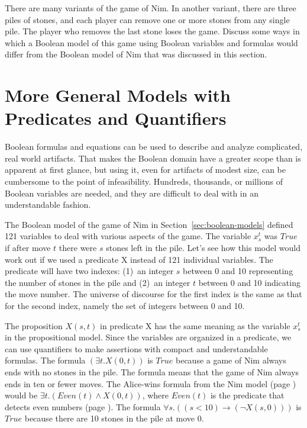 {{\begin{ExerciseList}
\Exercise
There are many variants of the game of Nim.
In another variant, there are three piles of stones, and each player can remove
one or more stones from any single pile.
The player who removes the last stone loses the game.
Discuss some ways in which a Boolean model of this game
using Boolean variables and formulas would
differ from the Boolean model of Nim that was discussed in this section.

\end{ExerciseList}

\section{More General Models with Predicates and Quantifiers}
\label{sec:predicates}

Boolean formulas and equations can be used
to describe and analyze complicated, real world artifacts.
That makes the Boolean domain have a greater scope than is apparent at first glance,
but using it, even for artifacts of modest size,
can be cumbersome to the point of infeasibility.
Hundreds, thousands, or millions of Boolean variables are needed,
and they are difficult to deal with in an understandable fashion.

The Boolean model of the game of Nim in Section~\ref{sec:boolean-models}
defined 121 variables to deal with various aspects of the game.
The variable $x_s^t$
was $True$ if after move $t$ there were $s$ stones left in the pile.
Let's see how this model would work out if we used a predicate X
instead of 121 individual variables.
The predicate will have two indexes: (1)~an integer $s$ between 0 and 10
representing the number of stones in the pile
and (2)~an integer $t$ between 0 and 10 indicating the move number.
The universe of discourse for the first index is the same as that
for the second index, namely the set of integers between 0 and 10.

The proposition $X(s,t)$ in predicate X has the same meaning as the variable
$x_s^t$ in the propositional model.
Since the variables are organized in a predicate,
we can use quantifiers to make assertions with compact and understandable formulas.
The formula  $(\exists t.X(0,t))$
is $True$ because a game of Nim always ends with no
stones in the pile.
The formula means that the game of Nim always ends in ten or fewer moves.
The Alice-wins formula
from the Nim model (page \pageref{alice-wins-formula})
would be $\exists t.(Even(t) \wedge X(0,t))$,
where
$Even(t)$ is the predicate that detects even numbers
(page \pageref{even-number-predicate-Even}).
The formula $\forall s.((s < 10) \rightarrow (\neg X(s,0)))$
is $True$ because there are 10 stones in the pile at move 0.

}}
